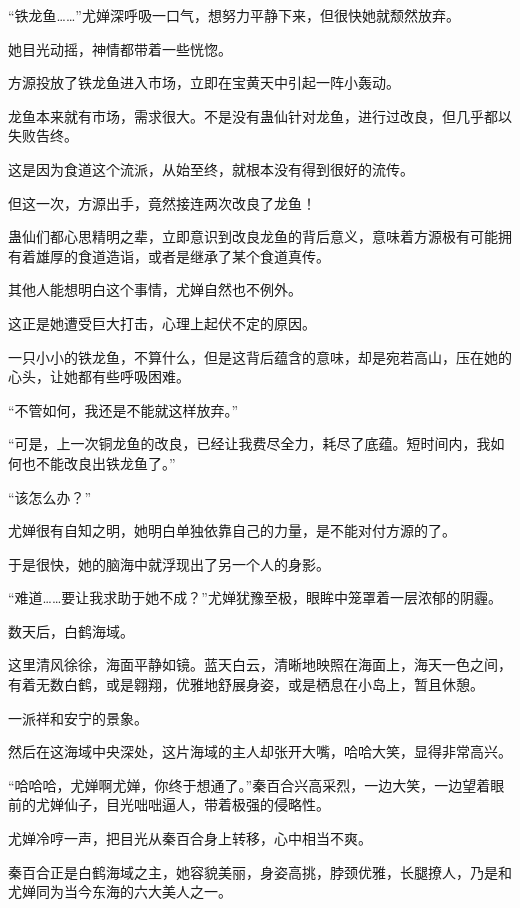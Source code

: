 
\begin{this_body}

“铁龙鱼……”尤婵深呼吸一口气，想努力平静下来，但很快她就颓然放弃。

她目光动摇，神情都带着一些恍惚。

方源投放了铁龙鱼进入市场，立即在宝黄天中引起一阵小轰动。

龙鱼本来就有市场，需求很大。不是没有蛊仙针对龙鱼，进行过改良，但几乎都以失败告终。

这是因为食道这个流派，从始至终，就根本没有得到很好的流传。

但这一次，方源出手，竟然接连两次改良了龙鱼！

蛊仙们都心思精明之辈，立即意识到改良龙鱼的背后意义，意味着方源极有可能拥有着雄厚的食道造诣，或者是继承了某个食道真传。

其他人能想明白这个事情，尤婵自然也不例外。

这正是她遭受巨大打击，心理上起伏不定的原因。

一只小小的铁龙鱼，不算什么，但是这背后蕴含的意味，却是宛若高山，压在她的心头，让她都有些呼吸困难。

“不管如何，我还是不能就这样放弃。”

“可是，上一次铜龙鱼的改良，已经让我费尽全力，耗尽了底蕴。短时间内，我如何也不能改良出铁龙鱼了。”

“该怎么办？”

尤婵很有自知之明，她明白单独依靠自己的力量，是不能对付方源的了。

于是很快，她的脑海中就浮现出了另一个人的身影。

“难道……要让我求助于她不成？”尤婵犹豫至极，眼眸中笼罩着一层浓郁的阴霾。

数天后，白鹤海域。

这里清风徐徐，海面平静如镜。蓝天白云，清晰地映照在海面上，海天一色之间，有着无数白鹤，或是翱翔，优雅地舒展身姿，或是栖息在小岛上，暂且休憩。

一派祥和安宁的景象。

然后在这海域中央深处，这片海域的主人却张开大嘴，哈哈大笑，显得非常高兴。

“哈哈哈，尤婵啊尤婵，你终于想通了。”秦百合兴高采烈，一边大笑，一边望着眼前的尤婵仙子，目光咄咄逼人，带着极强的侵略性。

尤婵冷哼一声，把目光从秦百合身上转移，心中相当不爽。

秦百合正是白鹤海域之主，她容貌美丽，身姿高挑，脖颈优雅，长腿撩人，乃是和尤婵同为当今东海的六大美人之一。


\end{this_body}

